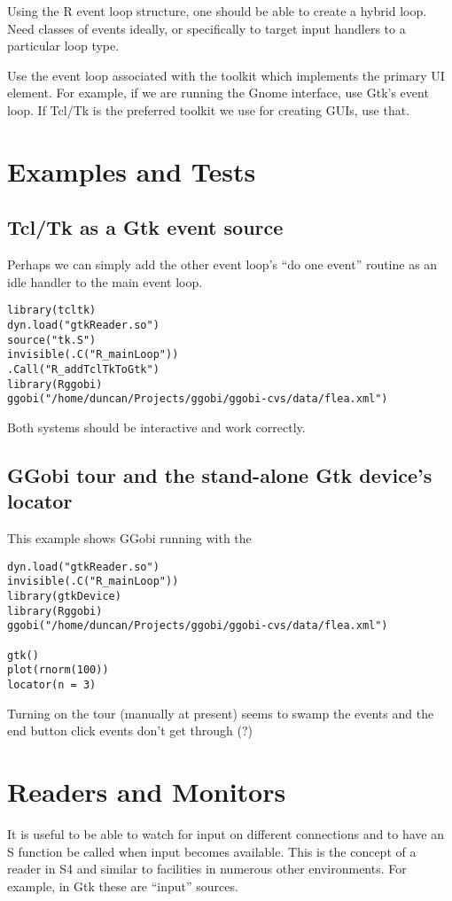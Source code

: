 \documentclass{article}
\begin{document}
Using the R event loop structure, one should be able to create a
hybrid loop. Need classes of events ideally, or specifically
to target input handlers to a particular loop type.


Use the event loop associated with the toolkit which implements the
primary UI element. For example, if we are running the Gnome
interface, use Gtk's event loop. If Tcl/Tk is the preferred toolkit we
use for creating GUIs, use that.

\section{Examples and Tests}

\subsection{Tcl/Tk as a Gtk event source}

Perhaps we can simply add the other event loop's ``do one event''
routine as an idle handler to the main event loop.

\begin{verbatim}
library(tcltk)
dyn.load("gtkReader.so")
source("tk.S")
invisible(.C("R_mainLoop"))
.Call("R_addTclTkToGtk")
library(Rggobi)
ggobi("/home/duncan/Projects/ggobi/ggobi-cvs/data/flea.xml")
\end{verbatim}

Both systems should be interactive and work correctly.



\subsection{GGobi tour and the stand-alone Gtk device's locator}
This example shows GGobi running
with the 
\begin{verbatim}
dyn.load("gtkReader.so")
invisible(.C("R_mainLoop"))
library(gtkDevice)
library(Rggobi)
ggobi("/home/duncan/Projects/ggobi/ggobi-cvs/data/flea.xml")

gtk()
plot(rnorm(100))
locator(n = 3)
\end{verbatim}

Turning on the tour (manually at present) seems to swamp the events
and the end button click events don't get through (?)


\section{Readers and Monitors}
It is useful to be able to watch for input on different connections
and to have an S function be called when input becomes available.
This is the concept of a reader in S4 and similar to facilities in
numerous other environments. For example, in Gtk these are ``input''
sources.  
\end{document}
